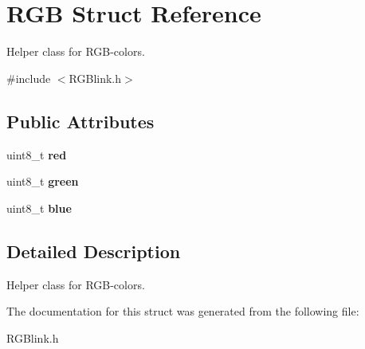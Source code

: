 \hypertarget{struct_r_g_b}{\section{R\-G\-B Struct Reference}
\label{struct_r_g_b}
}


Helper class for R\-G\-B-\/colors.  




{\ttfamily \#include $<$R\-G\-Blink.\-h$>$}

\subsection*{Public Attributes}
\begin{DoxyCompactItemize}
\item 
\hypertarget{struct_r_g_b_afbb25f9ed818b8149ffd04c5640d8c7a}{uint8\-\_\-t {\bfseries red}}\label{struct_r_g_b_afbb25f9ed818b8149ffd04c5640d8c7a}

\item 
\hypertarget{struct_r_g_b_a165f9a144b000655025edaacae2cae6b}{uint8\-\_\-t {\bfseries green}}\label{struct_r_g_b_a165f9a144b000655025edaacae2cae6b}

\item 
\hypertarget{struct_r_g_b_aa40a251e4fd9dfe9fb1c9b55585405cf}{uint8\-\_\-t {\bfseries blue}}\label{struct_r_g_b_aa40a251e4fd9dfe9fb1c9b55585405cf}

\end{DoxyCompactItemize}


\subsection{Detailed Description}
Helper class for R\-G\-B-\/colors. 

The documentation for this struct was generated from the following file\-:\begin{DoxyCompactItemize}
\item 
R\-G\-Blink.\-h\end{DoxyCompactItemize}
